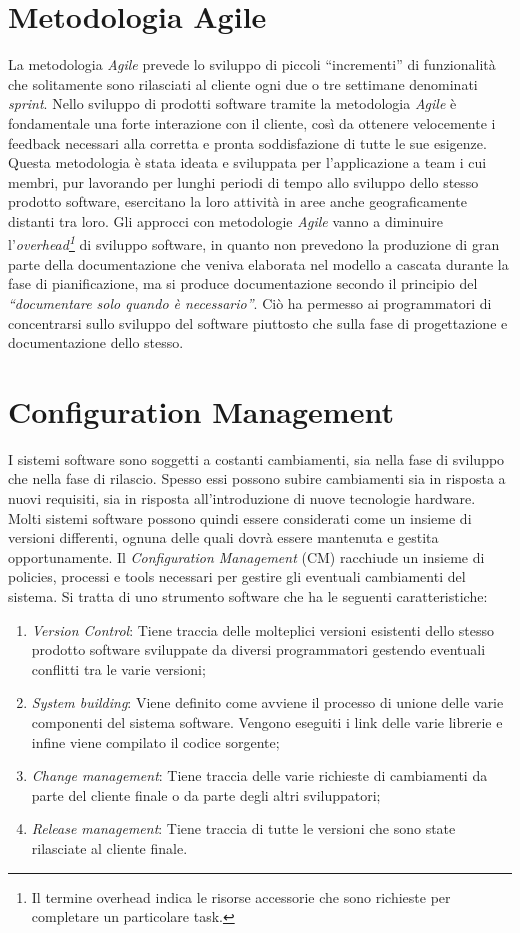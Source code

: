\section{Metodologia Agile}
La metodologia \emph{Agile} prevede lo sviluppo di piccoli “incrementi” di funzionalità che solitamente sono rilasciati al cliente ogni due o tre settimane denominati \emph{sprint}. Nello sviluppo di prodotti software tramite la metodologia \emph{Agile}
è fondamentale una forte interazione con il cliente, così da ottenere velocemente i feedback necessari alla corretta e pronta soddisfazione di tutte le sue esigenze.
Questa metodologia è stata ideata e sviluppata per l’applicazione a team i cui membri, pur lavorando per lunghi periodi di tempo allo sviluppo dello stesso prodotto software, esercitano la loro attività in aree anche geograficamente distanti tra loro. Gli approcci con metodologie \emph{Agile} vanno a diminuire l’\emph{overhead\footnote{Il termine overhead indica le risorse accessorie che sono richieste per completare un particolare task.}} di sviluppo software, in quanto non prevedono la produzione di gran parte della documentazione che veniva elaborata nel modello a cascata durante la fase di pianificazione, ma si produce documentazione secondo il principio del \emph{“documentare solo quando è necessario”}. Ciò ha permesso ai programmatori di
concentrarsi sullo sviluppo del software piuttosto che sulla fase di progettazione e documentazione dello stesso.
\section{Configuration Management}
I sistemi software sono soggetti a costanti cambiamenti, sia nella fase di
sviluppo che nella fase di rilascio. Spesso essi possono subire cambiamenti sia in risposta a nuovi requisiti, sia in risposta all’introduzione di nuove tecnologie
hardware. Molti sistemi software possono quindi essere considerati come un insieme di versioni differenti, ognuna delle quali dovrà essere mantenuta e gestita
opportunamente.
Il \emph{Configuration Management} (CM) racchiude un insieme di policies, processi e tools necessari per gestire gli eventuali cambiamenti del sistema. Si tratta di uno strumento software che ha le seguenti caratteristiche:
\begin{enumerate}
	\item \emph{Version Control}: Tiene traccia delle molteplici versioni esistenti dello stesso prodotto software sviluppate da diversi programmatori gestendo eventuali conflitti tra le varie versioni;
	\item \emph{System building}: Viene definito come avviene il processo di unione delle varie componenti del sistema software. Vengono eseguiti i link delle varie librerie e infine viene compilato il codice sorgente;
	\item \emph{Change management}: Tiene traccia delle varie richieste di cambiamenti da parte del cliente finale o da parte degli altri sviluppatori;
	\item \emph{Release management}: Tiene traccia di tutte le versioni che sono state rilasciate al cliente finale.
\end{enumerate}
